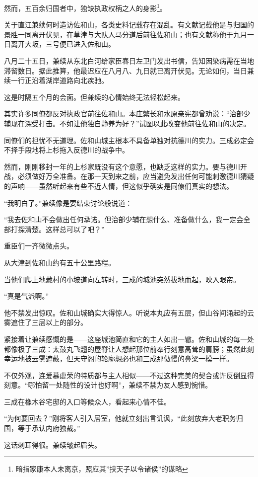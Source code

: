 \documentclass[
]{book}
\begin{document}
然而，五百余归国者中，独缺执政权柄之人的身影\footnote{暗指家康本人未离京，照应其''挟天子以令诸侯''的谋略}。

关于直江兼续何时造访佐和山，各类史料记载存在混乱。有文献记载他是与归国的景胜一同离开伏见，在草津与大队人马分道后前往佐和山；也有文献称他于九月一日离开大坂，三号便已进入佐和山。

八月二十五日，兼续从东北白河给家臣春日左卫门发出书信，告知因染病需在当地滞留数日。据此推算，他最迟应在八月八、九日就已离开伏见。无论如何，当日兼续一行正沿着湖岸道路向北疾驰。

这是时隔五个月的会面。但兼续的心情始终无法轻松起来。

其实许多同僚都反对执政官前往佐和山。本庄繁长和水原亲宪都曾劝说：``治部少辅现在深受打击。不如让他独自静养为好？''试图以此改变他前往佐和山的决定。

同僚们的担忧不无道理。佐和山城主根本不具备单独对抗德川的实力。三成必定会不择手段地将上杉拖入反德川的战争中。

然而，刚刚移封一年的上杉家既没有这个意愿，也缺乏这样的实力。要与德川开战，必须做好万全准备。在那一天到来之前，应当避免发出任何可能刺激德川猜疑的声响------虽然听起来有些不近人情，但这似乎确实是同僚们真实的想法。

``我明白了。''兼续像是要结束讨论般说道：

``我去佐和山不会做出任何承诺。但治部少辅在想什么、准备做什么，我一定会全部打探清楚。这样总可以了吧？''

重臣们一齐微微点头。

从大津到佐和山约有五十公里路程。

当他们爬上地藏村的小坡道向左转时，三成的城池突然拔地而起，映入眼帘。

``真是气派啊。''

他不禁发出惊叹。佐和山城确实大得惊人。听说本丸应有五层，但山谷间涌起的云雾遮住了三层以上的部分。

紧接着让兼续感慨的是------这座城池简直和它的主人如出一辙。佐和山城的每一处都像极了三成：太鼓丸飞翘的屋脊让人想起那位前奉行刻意高耸的肩膀；虽然此刻幸运地被云雾遮蔽，但天守阁的轮廓想必也和三成那傲慢的鼻梁一模一样。

不仅外观，连爱慕虚荣的特质都与主人相似------不过这种完美的契合或许反倒显得刻意。``哪怕留一处随性的设计也好啊''，兼续不禁为友人感到惋惜。

三成在橡木谷宅邸的入口等候众人，看起来心情不佳。

``为何要回去？''刚将客人引入居室，他就立刻出言讥讽，``此刻放弃大老职务归国，等于承认内府独裁。''

这话刺耳得很。兼续皱起眉头。
\end{document}
